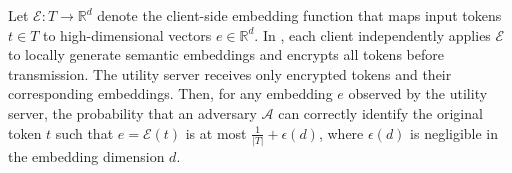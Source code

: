 \begin{theorem}
    Let \(\mathcal{E}: T \to \mathbb{R}^d\) denote the client-side embedding function that maps input tokens \(t \in T\) to high-dimensional vectors \(e \in \mathbb{R}^d\). In \Sys, each client independently applies \(\mathcal{E}\) to locally generate semantic embeddings and encrypts all tokens before transmission. The utility server receives only encrypted tokens and their corresponding embeddings. Then, for any embedding \(e\) observed by the utility server, the probability that an adversary \(\mathcal{A}\) can correctly identify the original token \(t\) such that \(e = \mathcal{E}(t)\) is at most \(\frac{1}{|T|} + \epsilon(d)\), where \(\epsilon(d)\) is negligible in the embedding dimension \(d\).
\end{theorem}

